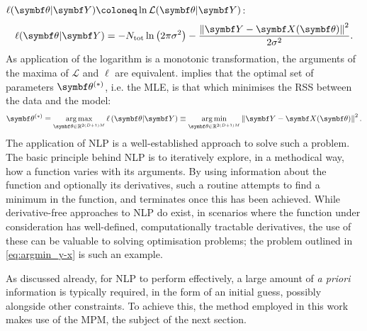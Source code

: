 $\ell(\bth \vert \bY) \coloneq \ln \mathcal{L}(\bth \vert
\bY)$:
\begin{equation}
    \ell(\bth \vert \bY) =
        -N_{\text{tot}} \ln\left(2 \pi \sigma^2\right)
        -\frac{\left\lVert \bY - \bX(\bth) \right\rVert^2}{2\sigma^2}.
    \label{eq:log-likeihood}
\end{equation}
As application of the logarithm is a monotonic transformation, the
arguments of the maxima of $\mathcal{L}$ and $\ell$ are equivalent.
 implies that the optimal set of parameters
$\bth^{(*)}$, i.e. the \ac{MLE},
is that which minimises the \ac{RSS} between the data and the model:
\begin{equation}
    \bthstar = \argmax_{\bth \in \mathbb{R}^{2(D+1)M}}
        \ell\left(\bth \vert \bY\right) \equiv
        \argmin_{\bth \in \mathbb{R}^{2(D+1)M}} \left\lVert \bY - \bX(\bth) \right\rVert^2.
    \label{eq:argmin_y-x}
\end{equation}
The application of \ac{NLP} is a well-established approach to solve such a
problem\cite{Fletcher1987,Nocedal2006}. The basic principle behind \ac{NLP} is
to iteratively explore, in a methodical way, how a function varies with its
arguments. By using information about the function and optionally its
derivatives, such a routine attempts to find a minimum in the function, and
terminates once this has been achieved. While derivative-free approaches to
\ac{NLP} do exist\cite{Nelder1965,Kirkpatrick1983,Powell2009},
in scenarios where the function under consideration has well-defined,
computationally tractable derivatives, the use of these can be valuable to
solving optimisation problems; the problem outlined in
\cref{eq:argmin_y-x} is such an example.

As discussed already, for \ac{NLP} to perform effectively, a large amount of
\textit{a priori} information is typically required, in the form of an initial
guess, possibly alongside other constraints. To achieve this, the method
employed in this work makes use of the \ac{MPM}, the subject of the next
section.
